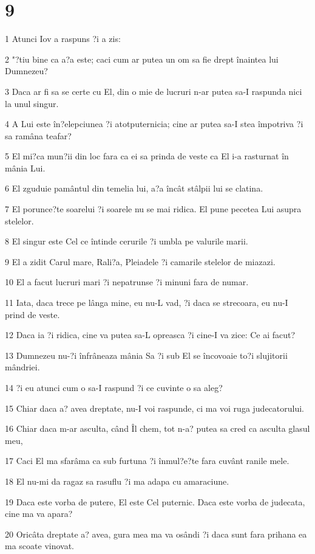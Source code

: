 \chapter{9}

\par 1 Atunci Iov a raspuns ?i a zis:
\par 2 "?tiu bine ca a?a este; caci cum ar putea un om sa fie drept înaintea lui Dumnezeu?
\par 3 Daca ar fi sa se certe cu El, din o mie de lucruri n-ar putea sa-I raspunda nici la unul singur.
\par 4 A Lui este în?elepciunea ?i atotputernicia; cine ar putea sa-I stea împotriva ?i sa ramâna teafar?
\par 5 El mi?ca mun?ii din loc fara ca ei sa prinda de veste ca El i-a rasturnat în mânia Lui.
\par 6 El zguduie pamântul din temelia lui, a?a încât stâlpii lui se clatina.
\par 7 El porunce?te soarelui ?i soarele nu se mai ridica. El pune pecetea Lui asupra stelelor.
\par 8 El singur este Cel ce întinde cerurile ?i umbla pe valurile marii.
\par 9 El a zidit Carul mare, Rali?a, Pleiadele ?i camarile stelelor de miazazi.
\par 10 El a facut lucruri mari ?i nepatrunse ?i minuni fara de numar.
\par 11 Iata, daca trece pe lânga mine, eu nu-L vad, ?i daca se strecoara, eu nu-I prind de veste.
\par 12 Daca ia ?i ridica, cine va putea sa-L opreasca ?i cine-I va zice: Ce ai facut?
\par 13 Dumnezeu nu-?i înfrâneaza mânia Sa ?i sub El se încovoaie to?i slujitorii mândriei.
\par 14 ?i eu atunci cum o sa-I raspund ?i ce cuvinte o sa aleg?
\par 15 Chiar daca a? avea dreptate, nu-I voi raspunde, ci ma voi ruga judecatorului.
\par 16 Chiar daca m-ar asculta, când Îl chem, tot n-a? putea sa cred ca asculta glasul meu,
\par 17 Caci El ma sfarâma ca sub furtuna ?i înmul?e?te fara cuvânt ranile mele.
\par 18 El nu-mi da ragaz sa rasuflu ?i ma adapa cu amaraciune.
\par 19 Daca este vorba de putere, El este Cel puternic. Daca este vorba de judecata, cine ma va apara?
\par 20 Oricâta dreptate a? avea, gura mea ma va osândi ?i daca sunt fara prihana ea ma scoate vinovat.
